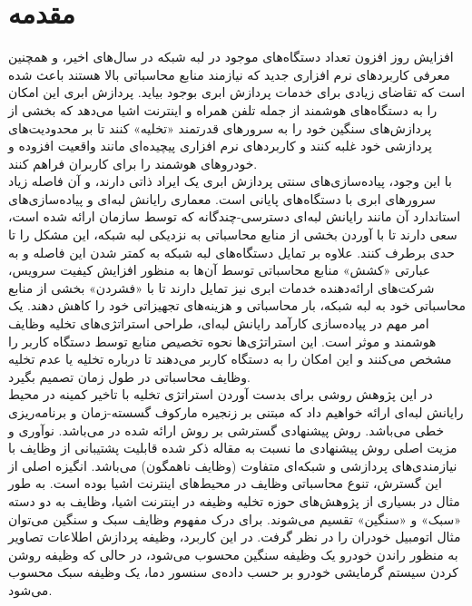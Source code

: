 \chapter{مقدمه} 
افزایش روز افزون تعداد دستگاه‌های موجود در لبه شبکه در سال‌های اخیر، و همچنین معرفی کاربردهای نرم افزاری جدید که نیازمند منابع محاسباتی بالا هستند باعث شده است که تقاضای زیادی برای خدمات پردازش ابری بوجود بیاید. پردازش ابری این امکان را به دستگاه‌های هوشمند از جمله تلفن همراه و اینترنت اشیا می‌دهد که بخشی از پردازش‌های سنگین خود را به سرورهای قدرتمند «تخلیه» کنند تا بر محدودیت‌های پردازشی خود غلبه کنند و کاربردهای نرم افزاری پیچیده‌ای مانند واقعیت افزوده و خودروهای هوشمند را برای کاربران فراهم کنند. \\

با این وجود، پیاده‌سازی‌های سنتی پردازش ابری یک ایراد ذاتی دارند، و آن فاصله زیاد سرورهای ابری با دستگاه‌های پایانی است. معماری رایانش لبه‌ای و پیاده‌سازی‌های استاندارد آن مانند رایانش لبه‌ای دسترسی-چندگانه که توسط سازمان  ارائه شده است، سعی دارند تا با آوردن بخشی از منابع محاسباتی به نزدیکی لبه شبکه، این مشکل را تا حدی برطرف کنند. علاوه بر تمایل دستگاه‌های لبه شبکه به کمتر شدن این فاصله و به عبارتی «کشش» منابع محاسباتی توسط آن‌ها به منظور افزایش کیفیت سرویس، شرکت‌های ارائه‌دهنده خدمات ابری نیز تمایل دارند تا با «فشردن» بخشی از منابع محاسباتی خود به لبه شبکه، بار محاسباتی و هزینه‌های تجهیزاتی خود را کاهش دهند. \cite{edgevisions}
\newpage
یک امر مهم در پیاده‌سازی کارآمد رایانش لبه‌ای، طراحی استراتژی‌های تخلیه وظایف هوشمند و موثر است. این استراتژی‌ها نحوه تخصیص منابع توسط دستگاه کاربر را مشخص می‌کنند و این امکان را به دستگاه کاربر می‌دهند تا درباره تخلیه یا عدم تخلیه وظایف محاسباتی در طول زمان تصمیم بگیرد. \\

در این پژوهش روشی برای بدست آوردن استراتژی تخلیه با تاخیر کمینه در محیط رایانش لبه‌ای ارائه خواهیم داد که مبتنی بر زنجیره مارکوف گسسته-زمان و برنامه‌ریزی خطی می‌باشد. روش پیشنهادی گسترشی بر روش ارائه شده در \cite{Liu} می‌باشد. نوآوری و مزیت اصلی روش پیشنهادی ما نسبت به مقاله ذکر شده قابلیت پشتیبانی از وظایف با نیازمندی‌های پردازشی و شبکه‌ای متفاوت (وظایف ناهمگون) می‌باشد. انگیزه اصلی از این گسترش، تنوع محاسباتی وظایف در محیط‌های اینترنت اشیا بوده است. به طور مثال در بسیاری از پژوهش‌های حوزه تخلیه وظیفه در اینترنت اشیا، وظایف به دو دسته «سبک» و «سنگین» تقسیم می‌شوند. \cite{yousefpour} \cite{tran} برای درک مفهوم وظایف سبک و سنگین می‌توان مثال اتومبیل خودران را در نظر گرفت. در این کاربرد، وظیفه پردازش اطلاعات تصاویر به منظور راندن خودرو یک وظیفه سنگین محسوب می‌شود، در حالی که وظیفه‌ روشن کردن سیستم گرمایشی خودرو بر حسب داده‌ی سنسور دما، یک وظیفه سبک محسوب می‌شود. \\

